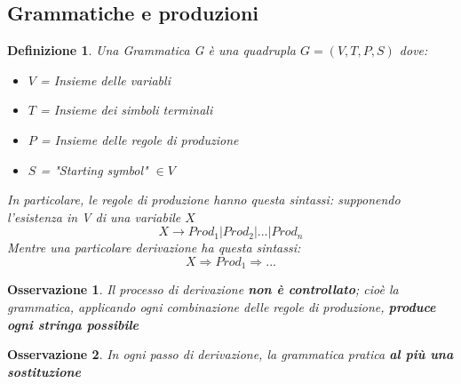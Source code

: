 \documentclass[12pt]{article}
\newtheorem{Definizione}{Definizione}[subsection]
\newtheorem{Osservazione}{Osservazione}[subsection]
\begin{document}
\subsection{Grammatiche e produzioni}
\begin{Definizione}
    Una Grammatica G è una quadrupla $G = (V, T, P, S)$ dove:
    \begin{itemize}
        \item $V$ = Insieme delle variabli
        \item $T$ = Insieme dei simboli terminali
        \item $P$ = Insieme delle regole di produzione
        \item $S$ = "Starting symbol" $\in V$
    \end{itemize}
    In particolare, le regole di produzione hanno questa sintassi: supponendo l'esistenza in V di una variabile $X$
    $$X \to Prod_1|Prod_2|...|Prod_n$$
    Mentre una particolare derivazione ha questa sintassi:
    $$X \Rightarrow Prod_1 \Rightarrow ...$$
\end{Definizione}
\begin{Osservazione}
    Il processo di derivazione \textbf{non è controllato}; cioè la \newline grammatica, applicando ogni combinazione delle regole di produzione, \textbf{produce ogni stringa possibile}
\end{Osservazione}
\begin{Osservazione}
    In ogni passo di derivazione, la grammatica pratica \textbf{al più una sostituzione}
\end{Osservazione}
\end{document}
